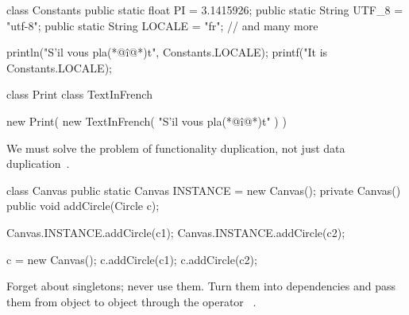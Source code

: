 \documentclass{article}
\begin{document}

\begin{pptWide}{2}
{\small\begin{ffcode}
class Constants {
  public static float PI = 3.1415926;
  public static String UTF_8 = "utf-8";
  public static String LOCALE = "fr";
  // and many more
}

println("S'il vous pla(*@\^{i}@*)t",
  Constants.LOCALE);
printf("It is %
  Constants.LOCALE);
\end{ffcode}
}
\par\columnbreak\par
{\small\begin{ffcode}
class Print { }
class TextInFrench { }

new Print(
  new TextInFrench(
    "S'il vous pla(*@\^{i}@*)t"
  )
)
\end{ffcode}
}
\end{pptWide}
\par
We must solve the problem of functionality duplication, not just data duplication~\citep{bugayenko2015blog0706}.
\plush{}

\begin{pptWide}{2}
{\small\begin{ffcode}
class Canvas {
  public static Canvas INSTANCE =
    new Canvas();
  private Canvas() {}
  public void addCircle(Circle c);
}

Canvas.INSTANCE.addCircle(c1);
Canvas.INSTANCE.addCircle(c2);
\end{ffcode}
}
\par\columnbreak\par
{\small\begin{ffcode}
c = new Canvas();
c.addCircle(c1);
c.addCircle(c2);
\end{ffcode}
}
\end{pptWide}
\par
Forget about singletons; never use them. Turn them into dependencies and pass
them from object to object through the operator ~\citep{bugayenko2016blog0627}.
\plush{}

\end{document}
